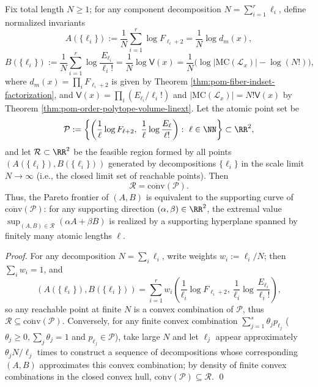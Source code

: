 \begin{theorem}\label{thm:pom-fiber-ab-convex-hull}
Fix total length \(N\ge 1\); for any component decomposition \(N=\sum_{i=1}^r \ell_i\), define normalized invariants
\[
A(\{\ell_i\})
:=\frac{1}{N}\sum_{i=1}^r \log F_{\ell_i+2}
=\frac{1}{N}\log d_m(x),
\]
\[
B(\{\ell_i\})
:=\frac{1}{N}\sum_{i=1}^r \log\frac{E_{\ell_i}}{\ell_i!}
=\frac{1}{N}\log \mathsf V(x)
=\frac{1}{N}\bigl(\log|\mathrm{MC}(\mathcal L_x)|-\log(N!)\bigr),
\]
where \(d_m(x)=\prod_i F_{\ell_i+2}\) is given by Theorem \ref{thm:pom-fiber-indset-factorization}, and \(\mathsf V(x)=\prod_i (E_{\ell_i}/\ell_i!)\) and \(|\mathrm{MC}(\mathcal L_x)|=N!\mathsf V(x)\) by Theorem \ref{thm:pom-order-polytope-volume-linext}.
Let the atomic point set be
\[
\mathcal P
:=
\left\{
\left(\frac{1}{\ell}\log F_{\ell+2},\ \frac{1}{\ell}\log\frac{E_\ell}{\ell!}\right):\ \ell\in\NN
\right\}
\subset\RR^2,
\]
and let \(\mathcal R\subset\RR^2\) be the feasible region formed by all points \((A(\{\ell_i\}),B(\{\ell_i\}))\) generated by decompositions \(\{\ell_i\}\) in the scale limit \(N\to\infty\) (i.e., the closed limit set of reachable points).
Then
\[
\mathcal R=\overline{\mathrm{conv}}(\mathcal P).
\]
Thus, the Pareto frontier of \((A,B)\) is equivalent to the supporting curve of \(\overline{\mathrm{conv}}(\mathcal P)\): for any supporting direction \((\alpha,\beta)\in\RR^2\), the extremal value \(\sup_{(A,B)\in\mathcal R}(\alpha A+\beta B)\) is realized by a supporting hyperplane spanned by finitely many atomic lengths \(\ell\).
\end{theorem}
\begin{proof}
For any decomposition \(N=\sum_i \ell_i\), write weights \(w_i:=\ell_i/N\); then \(\sum_i w_i=1\), and
\[
(A(\{\ell_i\}),B(\{\ell_i\}))
=\sum_{i=1}^r w_i\left(\frac{1}{\ell_i}\log F_{\ell_i+2},\ \frac{1}{\ell_i}\log\frac{E_{\ell_i}}{\ell_i!}\right),
\]
so any reachable point at finite \(N\) is a convex combination of \(\mathcal P\), thus \(\mathcal R\subseteq \overline{\mathrm{conv}}(\mathcal P)\).
Conversely, for any finite convex combination \(\sum_{j=1}^s \theta_j p_{\ell_j}\) (\(\theta_j\ge 0,\sum_j\theta_j=1\) and \(p_{\ell_j}\in\mathcal P\)), take large \(N\) and let \(\ell_j\) appear approximately \(\theta_j N/\ell_j\) times to construct a sequence of decompositions whose corresponding \((A,B)\) approximates this convex combination; by density of finite convex combinations in the closed convex hull, \(\overline{\mathrm{conv}}(\mathcal P)\subseteq \mathcal R\). \qed
\end{proof}

